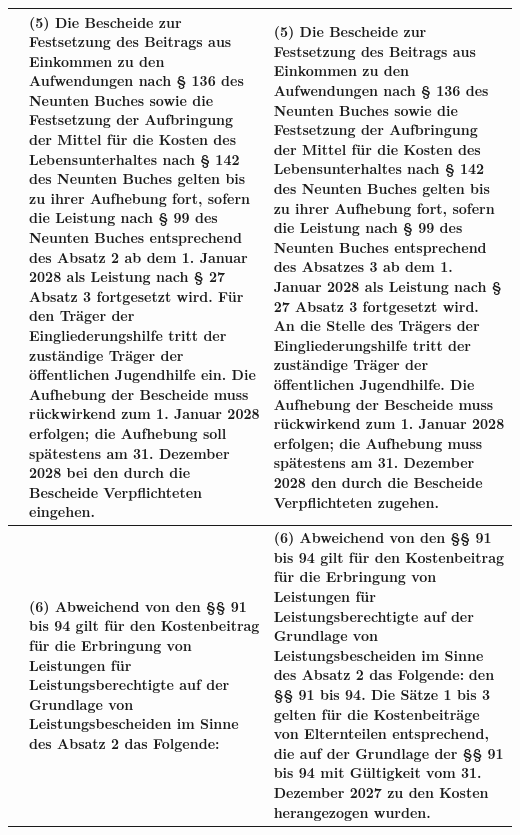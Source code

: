 \documentclass[10pt,a4paper,landscape]{article}
\begin{document}
\begin{longtable}{|L{8.6cm}|L{8.6cm}|L{8.6cm}|}
\hline
 & \textbf{(5) Die Bescheide zur Festsetzung des Beitrags aus Einkommen zu den Aufwendungen nach \S{} 136 des Neunten Buches sowie die Festsetzung der Aufbringung der Mittel für die Kosten des Lebensunterhaltes nach \S{} 142 des Neunten Buches gelten bis zu ihrer Aufhebung fort, sofern die Leistung nach \S{} 99 des Neunten Buches entsprechend des Absatz 2 ab dem 1. Januar 2028 als Leistung nach \S{} 27 Absatz 3 fortgesetzt wird. Für den Träger der Eingliederungshilfe tritt der zuständige Träger der öffentlichen Jugendhilfe ein. Die Aufhebung der Bescheide muss rückwirkend zum 1. Januar 2028 erfolgen; die Aufhebung soll spätestens am 31. Dezember 2028 bei den durch die Bescheide Verpflichteten eingehen}. & \textbf{(5) Die Bescheide zur Festsetzung des Beitrags aus Einkommen zu den }\textbf{Aufwendungen nach \S{} 136 des Neunten Buches sowie die Festsetzung der Aufbringung der Mittel für die Kosten des Lebensunterhaltes nach \S{} 142 des Neunten Buches gelten bis zu ihrer Aufhebung fort, sofern die Leistung nach \S{} 99 des Neunten Buches entsprechend des Absatzes 3 ab dem 1. Januar 2028 als Leistung nach \S{} 27 Absatz 3 fortgesetzt wird. An die Stelle des Trägers der Eingliederungshilfe tritt der zuständige Träger der öffentlichen Jugendhilfe. Die Aufhebung der Bescheide muss rückwirkend zum 1. Januar 2028 erfolgen; die Aufhebung muss spätestens am 31. Dezember 2028 den durch die Bescheide Verpflichteten zugehen. } \\
\hline
 & \textbf{(6) Abweichend von den \S{}\S{} 91 bis 94 gilt für den Kostenbeitrag für die Erbringung von Leistungen für Leistungsberechtigte auf der Grundlage von Leistungsbescheiden im Sinne des Absatz 2 das Folgende: } & \textbf{(6) Abweichend von den \S{}\S{} 91 bis 94 gilt für den Kostenbeitrag für die Erbringung von Leistungen für Leistungsberechtigte auf der Grundlage von Leistungsbescheiden im Sinne des Absatz 2 das Folgende: }\textbf{den \S{}\S{} 91 bis 94. Die Sätze 1 bis 3 gelten für die Kostenbeiträge von Elternteilen entsprechend, die auf der Grundlage der \S{}\S{} 91 bis 94 mit Gültigkeit vom 31. Dezember 2027 zu den Kosten herangezogen wurden. } \\
\hline

\end{longtable}
\end{document}
